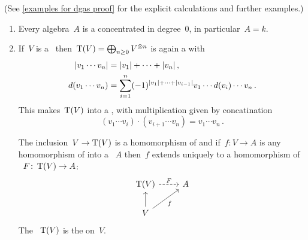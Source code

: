 \documentclass[a4paper,10pt,headings=standardclasses]{scrartcl}
\begin{document}
\begin{examples}
  \label{examples for dgas}
  (See \cref{examples for dgas proof} for the explicit calculations and further examples.)
  \begin{enumerate}
    \item
      Every algebra~$A$ is a {\dga} concentrated in degree~$0$, in particular~$A = k$.
    \item
      If~$V$ is a~{\dgv} then~$\operatorname{T}(V) = \bigoplus_{n \geq 0} V^{\otimes n}$ is again a {\dgv} with
      \begin{align*}
        \lvert v_1 \dotsm v_n\rvert
        &=
        \lvert v_1\rvert + \dotsb + \lvert v_n\rvert \,,
      \\
        d(v_1 \dotsm v_n)
        &=
        \sum_{i=1}^n
        (-1)^{\lvert v_1\rvert + \dotsb + \lvert v_{i-1}\rvert}
        v_1 \dotsm d(v_i) \dotsm v_n \,.
      \end{align*}
      This makes~$\operatorname{T}(V)$ into a {\dga}, with multiplication given by concatination
      \[
        (v_1 \dotsm v_i) \cdot (v_{i+1} \dotsm v_n)
        =
        v_1 \dotsm v_n \,.
      \]

      The inclusion~$V \to \operatorname{T}(V)$ is a homomorphism of {\dgvs} and if~$f \colon V \to A$ is any homomorphism of {\dgvs} into a {\dga}~$A$ then~$f$ extends uniquely to a homomorphism of {\dgas}~$F \colon \operatorname{T}(V) \to A$:
      \[
        \begin{tikzcd}
          \dgTensor(V)
          \arrow[dashed]{r}[above]{F}
          &
          A
          \\
          V
          \arrow{u}
          \arrow{ur}[below right]{f}
          &
          {}
        \end{tikzcd}
      \]
      The {\dga}~$\operatorname{T}(V)$ is the  on~$V$.
  \end{enumerate}
\end{examples}
\end{document}

